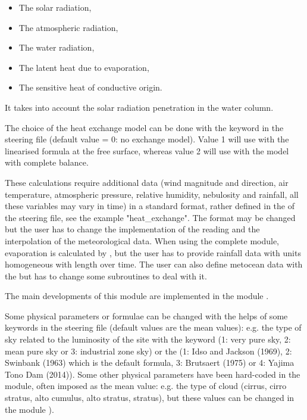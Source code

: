 \begin{itemize}
\item  The solar radiation,

\item  The atmospheric radiation,

\item  The water radiation,

\item  The latent heat due to evaporation,

\item  The sensitive heat of conductive origin.
\end{itemize}

It takes into account the solar radiation penetration in the water column.

The choice of the heat exchange model can be done with the keyword
 in the \waqtel steering file
(default value = 0: no exchange
model). Value 1 will use with the linearised formula at the free surface,
whereas value 2 will use with the model with complete balance.

These calculations require additional data (wind magnitude and direction, air
temperature, atmospheric pressure, relative humidity, nebulosity and rainfall,
all these variables may vary in time) in a standard format, rather defined
in the  of the  steering file,
see the example "heat\_exchange".
The format may be changed but the user has to change the
implementation of the reading and the interpolation of the meteorological data.
When using the complete module, evaporation is calculated by , but
the user has to provide rainfall data with units homogeneous with length over
time.
The user can also define metocean data with the
 but has to change some subroutines
to deal with it.

The main developments of this module are implemented in the module
.

Some physical parameters or formulae can be changed with the helps of some
keywords in the \waqtel steering file (default values are the mean values): e.g.
the type of sky related to the luminosity of the site with the \waqtel keyword
 (1: very pure sky, 2: mean pure sky or 3:
industrial zone sky) or the 
(1: Idso and Jackson (1969), 2: Swinbank (1963) which is the default formula,
3: Brutsaert (1975) or 4: Yajima Tono Dam (2014)).
Some other physical parameters have been hard-coded in the module, often
imposed as the mean value: e.g. the type of cloud (cirrus,
cirro stratus, alto cumulus, alto stratus, stratus), but these values can be
changed in the module ).

